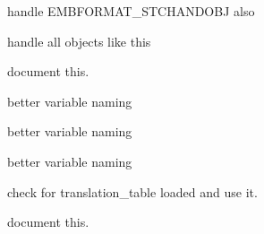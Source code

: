 \begin{DoxyRefList}
\label{todo__todo000220}%
%
handle EMBFORMAT\+\_\+\+STCHANDOBJ also 

\label{todo__todo000221}%
%
handle all objects like this  
\item[Global \mbox{\hyperlink{src_2main_8c_a5307d28a0ab917195f11a89a0dd1e265}{snowflake\+\_\+main}} ()]\label{todo__todo000232}%
%
document this.  
\item[Global \mbox{\hyperlink{struct_sub_descriptor___affb2c75b7f632338f368aafab49f678d}{Sub\+Descriptor\+\_\+\+::color\+Code}} ]\label{todo__todo000405}%
%
better variable naming  
\item[Global \mbox{\hyperlink{struct_sub_descriptor___a0cfe04519ff6dab092ee7c002e55e520}{Sub\+Descriptor\+\_\+\+::some\+Int}} ]\label{todo__todo000403}%
%
better variable naming  
\item[Global \mbox{\hyperlink{struct_sub_descriptor___a6154b0f4ec7815c6d26c71852506418e}{Sub\+Descriptor\+\_\+\+::some\+Other\+Int}} ]\label{todo__todo000404}%
%
better variable naming  
\item[Global \mbox{\hyperlink{src_2main_8c_a84be33a7d31671fab1c88149df77a831}{translate}} (const char $\ast$string)]\label{todo__todo000080}%
%
check for translation\+\_\+table loaded and use it.  
\item[Global \mbox{\hyperlink{src_2main_8c_a459ace9a6c614fe41b7f08ba91bc6dd4}{Undo\+History}} ]\label{todo__todo000001}%
%
document this. 
\end{DoxyRefList}